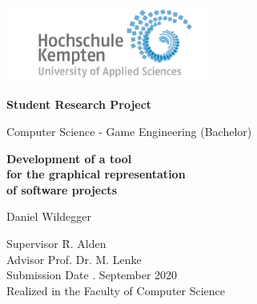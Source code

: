 \thispagestyle{empty}



\vspace*{-20mm}
\begin{flushright}
\includegraphics[width=0.5\textwidth]{Bilder/LogoHS.png}
\end{flushright}


\vspace*{2cm}

\begin{center}
{\Large \textbf{Student Research Project}}\\ 

\vspace*{1cm}

{\large Computer Science - Game Engineering (Bachelor)\\[1mm]}

\vspace{1cm}

{\Large \bfseries Development of a tool \\
				  for the graphical representation \\
				  of software projects \\}


\vspace{1.5cm}

{\large Daniel Wildegger}\\[40mm]

\end{center}

\vfill

\parbox{120mm}{
\begin{tabbing}
Supervisor \hspace{1.2cm}    \= R. Alden\\
Advisor						\> Prof. Dr. M. Lenke\\
Submission Date             . September 2020\\
Realized in the             \> Faculty of Computer Science\\[4mm]
\end{tabbing}
}

